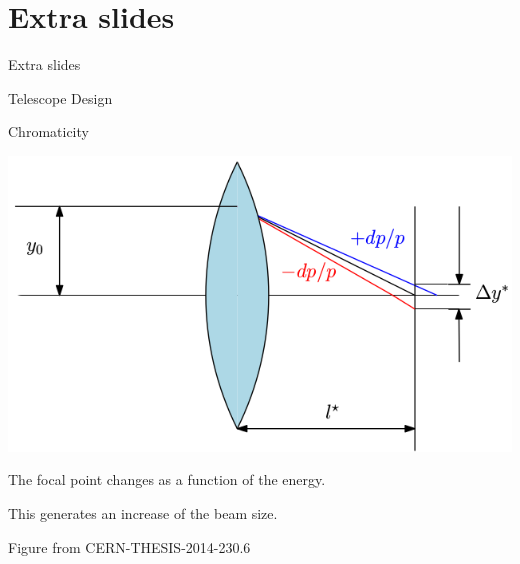 \documentclass{beamer}
\begin{document}
\section*{Extra slides}
\begin{frame}
 \color{blue}\Large Extra slides
\end{frame}
\begin{frame}
 \color{blue}\Large Telescope Design
\end{frame}
\begin{frame}{Chromaticity}
\begin{center}
 \includegraphics[scale=0.60,angle=0]{chrom.png}
\end{center}
The focal point changes as a function of the energy.\par
This generates an increase of the beam size.\par
{\tiny Figure from CERN-THESIS-2014-230.6}
\end{frame}
\end{document}

